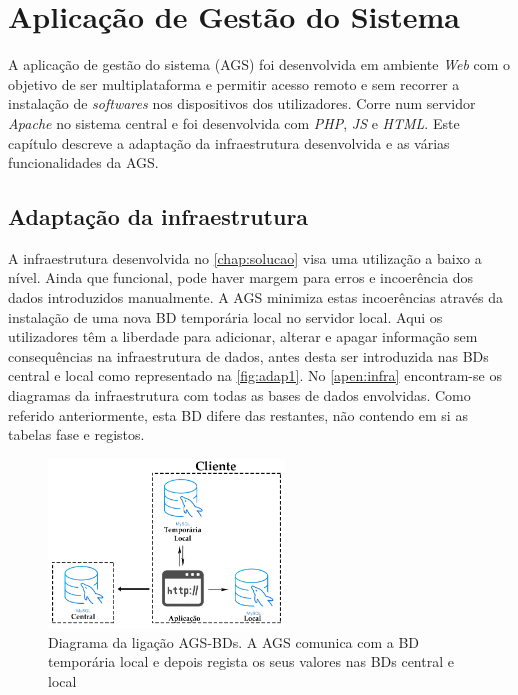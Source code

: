 \documentclass[11pt,twoside,a4paper]{report}
\begin{document}
\cleardoublepage
\chapter{Aplicação de Gestão do Sistema}
\label{chap:aplicacao}
A aplicação de gestão do sistema (AGS) foi desenvolvida em ambiente \textit{Web} com o objetivo de ser multiplataforma e permitir acesso remoto e sem recorrer a instalação de \textit{softwares} nos dispositivos dos utilizadores. Corre num servidor \textit{Apache} no sistema central e foi desenvolvida com \textit{PHP}, \textit{JS} e \textit{HTML}. Este capítulo descreve a adaptação da infraestrutura desenvolvida e as várias funcionalidades da AGS.

\section{Adaptação da infraestrutura}
\label{subchap:adap}
A infraestrutura desenvolvida no \autoref{chap:solucao} visa uma utilização a baixo a nível. Ainda que funcional, pode haver margem para erros e incoerência dos dados introduzidos manualmente. A AGS minimiza estas incoerências através da instalação de uma nova BD temporária local no servidor local. Aqui os utilizadores têm a liberdade para adicionar, alterar e apagar informação sem consequências na infraestrutura de dados, antes desta ser introduzida nas BDs central e local como representado na \autoref{fig:adap1}. No \autoref{apen:infra} encontram-se os diagramas da infraestrutura com todas as bases de dados envolvidas. Como referido anteriormente, esta BD difere das restantes, não contendo em si as tabelas fase e registos.
\begin{figure}[H]
	\begin{center}
		\includegraphics[width=0.56\textwidth]{Aplicacao_temp_local_central} %
		\caption[Diagrama da ligação AGS-BDs]{Diagrama da ligação AGS-BDs. A AGS comunica com a BD temporária local e depois regista os seus valores nas BDs central e local}
		\label{fig:adap1}
	\end{center}
\end{figure}
\end{document}
